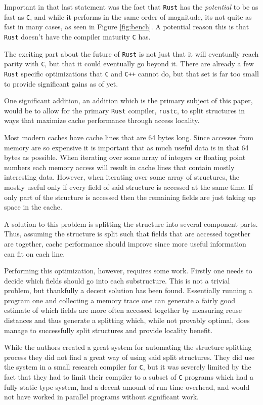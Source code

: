 \documentclass[prodmode,acmtecs]{acmsmall} %
\newcommand{\rustname}{{\texttt{Rust}}}
\def \rust {\rustname{}\xspace}
\newcommand{\rustcname}{{\texttt{rustc}}}
\def \rustc {\rustcname{}\xspace}
\newcommand{\cname}{{\texttt{C}}}
\def \c {\cname{}\xspace}
\newcommand{\cppname}{{\texttt{C++}}}
\def \cpp {\cppname{}\xspace}
\begin{document}
Important in that last statement was the fact that \rust has the 
\textit{potential}
to be as fast as \c, and while it performs in the same order of magnitude, its not
quite as fast in many cases, as seen in Figure \ref{fig:bench}.
A potential reason this is that \rust doesn't have the compiler maturity \c has.

The exciting part about the future of \rust is not just that it will eventually
reach parity with \c, but that it could eventually go beyond it. There are
already a few \rust specific optimizations that \c and \cpp cannot do, but that
set is far too small to provide significant gains as of yet.

One significant addition, an addition which is the primary subject of this
paper, would be to allow for the primary \rust compiler, \rustc, to split
structures in ways that maximize cache performance through access locality.

Most modern caches have cache lines that are 64 bytes long. Since accesses from
memory are so expensive it is important that as much useful data is in that 64
bytes as possible. When iterating over some array of integers or floating point
numbers each memory access will result in cache lines that contain mostly
interesting data. However, when iterating over some array of structures,
the mostly useful only
if every field of said structure is accessed at the same time. If only part of
the structure is accessed then the remaining fields are just taking up space in
the cache.

A solution to this problem is splitting the structure into several component
parts. Thus, assuming the structure is split such that fields that are accessed
together are together, cache performance should improve since more useful 
information can fit on each line.

Performing this optimization, however, requires some work. Firstly one
needs to decide which fields should go into
each substructure. This is not a trivial problem, but thankfully a decent
solution has been found\cite{Zhong:2004:ARS:996893.996872}.
Essentially running a program one and collecting
a memory trace one can generate a fairly good estimate of which fields are more
often accessed together by measuring reuse distances and 
thus generate a splitting which, while not provably optimal, 
does manage to successfully split structures and
provide locality benefit.

While the authors created a great system for automating the structure splitting 
process they did not find a great way of using said split structures. They did
use the system in a small research compiler for \c, but it was severely limited
by the fact that they had to limit their compiler to a subset of \c programs
which had a fully static type system, had a decent amount of run time overhead, 
and would not have worked in parallel programs without significant work.
\end{document}
